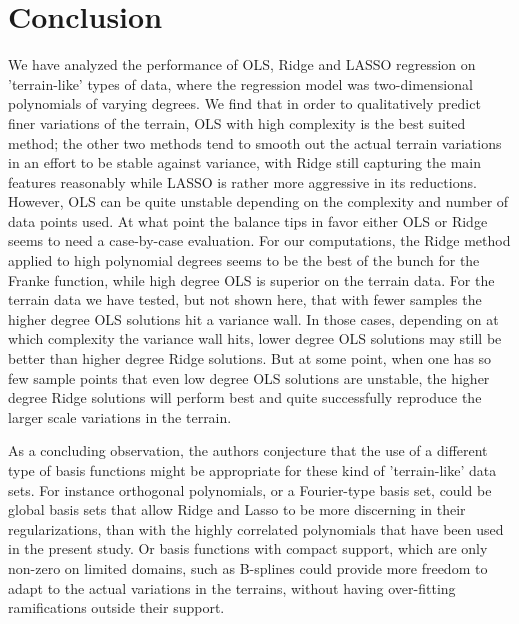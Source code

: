\documentclass[reprint, english, nofootinbib]{revtex4-2}
\begin{document}
\section{Conclusion}


We have analyzed the performance of OLS, Ridge and LASSO regression on 'terrain-like' types of data, where the regression model was two-dimensional polynomials of varying degrees. We find that in order to qualitatively predict finer variations of the terrain,  OLS with high complexity is the best suited method; the other two methods tend to smooth out the actual terrain variations in an effort to be stable against variance, with Ridge still capturing the main features reasonably while LASSO is rather more aggressive in its reductions. However, OLS can be quite unstable depending on the complexity and number of data points used. At what point the balance tips in favor either OLS or Ridge seems to need a case-by-case evaluation. For our computations, the Ridge method applied to high polynomial degrees seems to be the best of the bunch for the Franke function, while high degree OLS is superior on the terrain data. For the terrain data we have tested, but not shown here, that with fewer samples the higher degree OLS solutions hit a variance wall. In those cases, depending on at which complexity the variance wall hits, lower degree OLS solutions may still be better than higher degree Ridge solutions. But at some point, when one has so few sample points that even low degree OLS solutions are unstable, the higher degree Ridge solutions will perform best and quite successfully reproduce the larger scale variations in the terrain.

As a concluding observation, the authors conjecture that the use of a different type of basis functions might be appropriate for these kind of 'terrain-like' data sets. For instance orthogonal polynomials, or a Fourier-type basis set, could be global basis sets that allow Ridge and Lasso to be more discerning in their regularizations, than with the highly correlated polynomials that have been used in the present study. Or basis functions with compact support, which are only non-zero on limited domains, such as B-splines could provide more freedom to adapt to the actual variations in the terrains, without having over-fitting ramifications outside their support.


\onecolumngrid

\newpage
\twocolumngrid
\appendix
\end{document}
